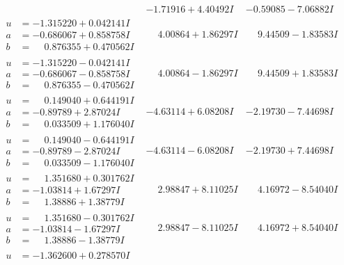 \documentclass[1p]{elsarticle_modified}
\theoremstyle{definition}
\begin{document}
$$\begin{array}{c|c|c}
 & -1.71916 + 4.40492 I & -0.59085 - 7.06882 I \\ \hline\begin{aligned}
u &= -1.315220 + 0.042141 I \\
a &= -0.686067 + 0.858758 I \\
b &= \phantom{-}0.876355 + 0.470562 I\end{aligned}
 & \phantom{-}4.00864 + 1.86297 I & \phantom{-}9.44509 - 1.83583 I \\ \hline\begin{aligned}
u &= -1.315220 - 0.042141 I \\
a &= -0.686067 - 0.858758 I \\
b &= \phantom{-}0.876355 - 0.470562 I\end{aligned}
 & \phantom{-}4.00864 - 1.86297 I & \phantom{-}9.44509 + 1.83583 I \\ \hline\begin{aligned}
u &= \phantom{-}0.149040 + 0.644191 I \\
a &= -0.89789 + 2.87024 I \\
b &= \phantom{-}0.033509 + 1.176040 I\end{aligned}
 & -4.63114 + 6.08208 I & -2.19730 - 7.44698 I \\ \hline\begin{aligned}
u &= \phantom{-}0.149040 - 0.644191 I \\
a &= -0.89789 - 2.87024 I \\
b &= \phantom{-}0.033509 - 1.176040 I\end{aligned}
 & -4.63114 - 6.08208 I & -2.19730 + 7.44698 I \\ \hline\begin{aligned}
u &= \phantom{-}1.351680 + 0.301762 I \\
a &= -1.03814 + 1.67297 I \\
b &= \phantom{-}1.38886 + 1.38779 I\end{aligned}
 & \phantom{-}2.98847 + 8.11025 I & \phantom{-}4.16972 - 8.54040 I \\ \hline\begin{aligned}
u &= \phantom{-}1.351680 - 0.301762 I \\
a &= -1.03814 - 1.67297 I \\
b &= \phantom{-}1.38886 - 1.38779 I\end{aligned}
 & \phantom{-}2.98847 - 8.11025 I & \phantom{-}4.16972 + 8.54040 I \\ \hline\begin{aligned}
u &= -1.362600 + 0.278570 I \\

\end{aligned}
\end{array}$$
\end{document}
